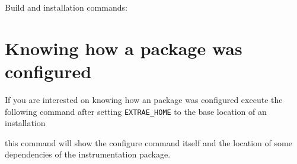 Build and installation commands:


\section{Knowing how a package was configured}

If you are interested on knowing how an \TRACE package was configured execute the following command after setting {\tt EXTRAE\_HOME} to the base location of an installation


this command will show the configure command itself and the location of some dependencies of the instrumentation package.
